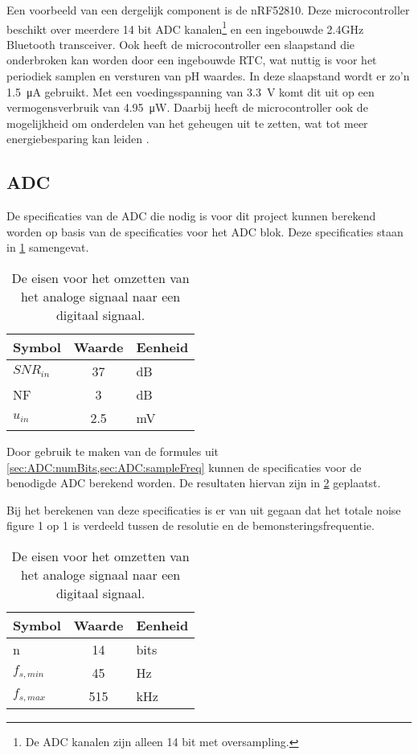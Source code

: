 Een voorbeeld van een dergelijk component is de nRF52810. Deze microcontroller beschikt over meerdere 14 bit ADC kanalen\footnote{De ADC kanalen zijn alleen 14 bit met oversampling.} en een ingebouwde 2.4GHz Bluetooth transceiver.
Ook heeft de microcontroller een slaapstand die onderbroken kan worden door een ingebouwde RTC, wat nuttig is voor het periodiek samplen en versturen van pH waardes. In deze slaapstand wordt er zo'n \qty{1.5}{\micro\ampere} gebruikt. Met een voedingsspanning van \qty{3.3}{\volt} komt dit uit op een vermogensverbruik van \qty{4.95}{\micro\watt}. Daarbij heeft de microcontroller ook de mogelijkheid om onderdelen van het geheugen uit te zetten, wat tot meer energiebesparing kan leiden \cite{nrf52810}.


\subsection{ADC}
De specificaties van de ADC die nodig is voor dit project kunnen berekend worden op basis van de specificaties voor het ADC blok. Deze specificaties staan in \cref{tab:systemSpecADC} samengevat.
\begin{table}[!htbp]
    \centering
    \begin{tabular}{l|c|l}
        Symbol      & Waarde & Eenheid\\\hline
        $SNR_{in}$  & 37        & dB\\
        NF          & 3         & dB\\
        $u_{in}$    & 2.5       & mV\\
    \end{tabular}
    \caption{De eisen voor het omzetten van het analoge signaal naar een digitaal signaal.}
    \label{tab:systemSpecADC}
\end{table}

Door gebruik te maken van de formules uit \cref{sec:ADC:numBits,sec:ADC:sampleFreq} kunnen de specificaties voor de benodigde ADC berekend worden. De resultaten hiervan zijn in  \cref{tab:specADC} geplaatst.

Bij het berekenen van deze specificaties is er van uit gegaan dat het totale noise figure 1 op 1 is verdeeld tussen de resolutie en de bemonsteringsfrequentie.
\begin{table}[!htbp]
    \centering
    \begin{tabular}{l|c|l}
        Symbol      & Waarde    & Eenheid\\\hline
        n           & 14        & bits\\
        $f_{s,min}$ & 45        & Hz\\
        $f_{s,max}$ & 515       & kHz\\
    \end{tabular}
    \caption{De eisen voor het omzetten van het analoge signaal naar een digitaal signaal.}
    \label{tab:specADC}
\end{table}

